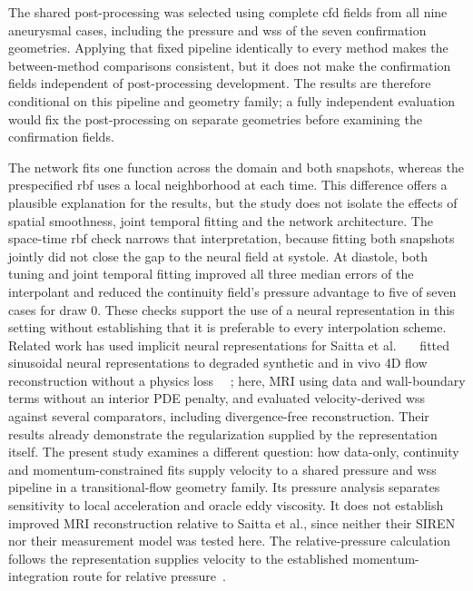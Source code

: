 \documentclass[12pt,a4paper]{article}
\newcommand{\cfdrevision}[1]{#1} %
\newcommand{\CFD}{\ac{cfd}\xspace}
\newcommand{\WSS}{\ac{wss}\xspace}
\newcommand{\RBF}{\ac{rbf}\xspace}
\theoremstyle{definition}
\numberwithin{equation}{section}
\providecommand{\DIFaddtex}[1]{{\protect\color{blue} \sf #1}} %
\providecommand{\DIFdeltex}[1]{{\protect\color{red} \scriptsize #1}} %
\providecommand{\DIFaddbegin}{} %
\providecommand{\DIFaddend}{} %
\providecommand{\DIFdelbegin}{} %
\providecommand{\DIFdelend}{} %
\providecommand{\DIFadd}[1]{\texorpdfstring{\DIFaddtex{#1}}{#1}} %
\providecommand{\DIFdel}[1]{\texorpdfstring{\DIFdeltex{#1}}{}} %
\newcommand{\DIFscaledelfig}{0.5}
\newlength{\DIFdelgraphicswidth} %
\newlength{\DIFdelgraphicsheight} %
\newcommand{\DIFaddincludegraphics}[2][]{{\color{blue}\fbox{\DIFOincludegraphics[#1]{#2}}}} %
\newcommand{\DIFdelincludegraphics}[2][]{%
\sbox{\DIFdelgraphicsbox}{\DIFOincludegraphics[#1]{#2}}%
\settoboxwidth{\DIFdelgraphicswidth}{\DIFdelgraphicsbox} %
\settoboxtotalheight{\DIFdelgraphicsheight}{\DIFdelgraphicsbox} %
\scalebox{\DIFscaledelfig}{%
\parbox[b]{\DIFdelgraphicswidth}{\usebox{\DIFdelgraphicsbox}\\[-\baselineskip] \rule{\DIFdelgraphicswidth}{0em}}\llap{\resizebox{\DIFdelgraphicswidth}{\DIFdelgraphicsheight}{%
\setlength{\unitlength}{\DIFdelgraphicswidth}%
\begin{picture}(1,1)%
\thicklines\linethickness{2pt} %
{\color[rgb]{1,0,0}\put(0,0){\framebox(1,1){}}}%
{\color[rgb]{1,0,0}\put(0,0){\line( 1,1){1}}}%
{\color[rgb]{1,0,0}\put(0,1){\line(1,-1){1}}}%
\end{picture}%
}\hspace*{3pt}}} %
} %
\DeclareRobustCommand{\DIFaddbegin}{\DIFOaddbegin \let\includegraphics\DIFaddincludegraphics} %
\DeclareRobustCommand{\DIFaddend}{\DIFOaddend \let\includegraphics\DIFOincludegraphics} %
\DeclareRobustCommand{\DIFdelbegin}{\DIFOdelbegin \let\includegraphics\DIFdelincludegraphics} %
\DeclareRobustCommand{\DIFdelend}{\DIFOaddend \let\includegraphics\DIFOincludegraphics} %
\begin{document}
\DIFadd{\cfdrevision{The shared post-processing was selected using complete \CFD fields from all nine aneurysmal cases, including the pressure and \WSS of the seven confirmation geometries. Applying that fixed pipeline identically to every method makes the between-method comparisons consistent, but it does not make the confirmation fields independent of post-processing development. The results are therefore conditional on this pipeline and geometry family; a fully independent evaluation would fix the post-processing on separate geometries before examining the confirmation fields.}
}

\DIFaddend The network fits one function across the domain and both snapshots, whereas the prespecified \RBF uses a local neighborhood at each time. This difference offers a plausible explanation for the results, but the study does not isolate the effects of spatial smoothness, joint temporal fitting and the network architecture. The space-time \RBF check narrows that interpretation, because fitting both snapshots jointly did not close the gap to the neural field at systole. At diastole, both tuning and joint temporal fitting improved all three median errors of the interpolant and reduced the continuity field's pressure advantage to five of seven cases for draw 0. These checks support the use of a neural representation in this setting without establishing that it is preferable to every interpolation scheme. \DIFdelbegin \DIFdel{Related work has used implicit neural representations for }\DIFdelend \DIFaddbegin \DIFadd{Saitta et al.~\mbox{%
\cite{saitta2024implicit} }\hskip0pt%
fitted sinusoidal neural representations to degraded synthetic and in vivo }\DIFaddend 4D flow \DIFdelbegin \DIFdel{reconstruction without a physics loss~\mbox{%
\cite{saitta2024implicit}}\hskip0pt%
; here, }\DIFdelend \DIFaddbegin \DIFadd{MRI using data and wall-boundary terms without an interior PDE penalty, and evaluated velocity-derived }\WSS \DIFadd{against several comparators, including divergence-free reconstruction. Their results already demonstrate the regularization supplied by the representation itself. The present study examines a different question: how data-only, continuity and momentum-constrained fits supply velocity to a shared pressure and }\WSS \DIFadd{pipeline in a transitional-flow geometry family. Its pressure analysis separates sensitivity to local acceleration and oracle eddy viscosity. It does not establish improved MRI reconstruction relative to Saitta et al., since neither their SIREN nor their measurement model was tested here. The relative-pressure calculation follows }\DIFaddend the \DIFdelbegin \DIFdel{representation supplies velocity to the }\DIFdelend established momentum-integration route\DIFdelbegin \DIFdel{for relative pressure}\DIFdelend ~\cite{krittian2012finite,bertoglio2018relative}.
\end{document}
